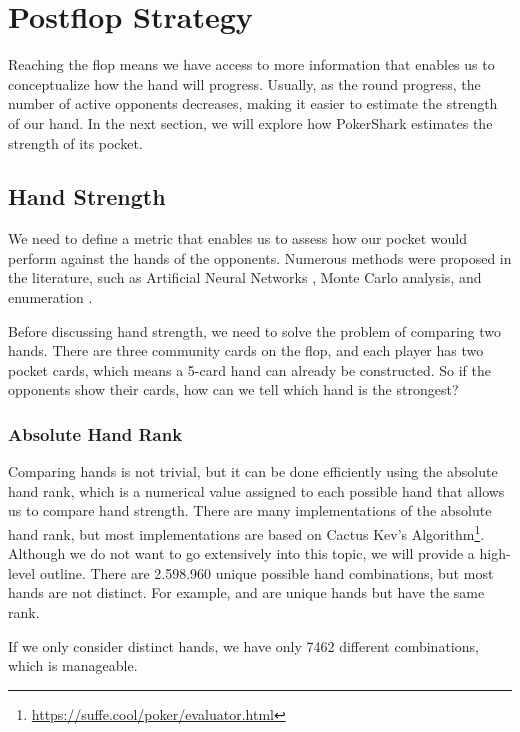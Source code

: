 \section{Postflop Strategy}
Reaching the flop means we have access to more information that enables us to conceptualize how the hand will progress. Usually, as the round progress, the number of active opponents decreases, making it easier to estimate the strength of our hand. In the next section, we will explore how PokerShark estimates the strength of its pocket.

\subsection{Hand Strength}
We need to define a metric that enables us to assess how our pocket would perform against the hands of the opponents. Numerous methods were proposed in the literature, such as Artificial Neural Networks \cite{bensson2013predicting}, Monte Carlo analysis, and enumeration \cite{billings_challenge_2002}.

Before discussing hand strength, we need to solve the problem of comparing two hands. There are three community cards on the flop, and each player has two pocket cards, which means a 5-card hand can already be constructed. So if the opponents show their cards, how can we tell which hand is the strongest?

\subsubsection{Absolute Hand Rank}
Comparing hands is not trivial, but it can be done efficiently using the absolute hand rank, which is a numerical value assigned to each possible hand that allows us to compare hand strength.
There are many implementations of the absolute hand rank, but most implementations are based on Cactus Kev's Algorithm\footnote{\url{https://suffe.cool/poker/evaluator.html}}. Although we do not want to go extensively into this topic, we will provide a high-level outline. There are 2.598.960 unique possible hand combinations, but most hands are not distinct. For example,  and   are unique hands but have the same rank.

If we only consider distinct hands, we have only 7462 different combinations, which is manageable.

